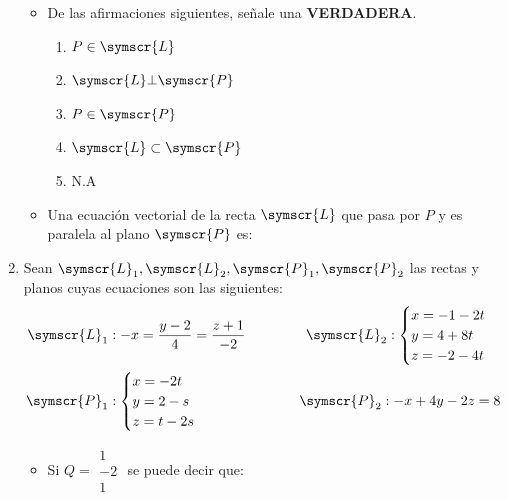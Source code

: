 \documentclass{article}
\def\fancyL{\symscr{L}}
\def\fancyP{\symscr{P}}
\begin{document}
\begin{enumerate}
\begin{itemize}
            \item De las afirmaciones siguientes, señale una \textbf{VERDADERA}.
                \begin{enumerate}
                    \item \(P \in \fancyL\)
                    \item \(\fancyL \bot \fancyP\)
                    \item \(P \in \fancyP\)
                    \item \(\fancyL \subset \fancyP\)
                    \item N.A
                \end{enumerate}
            \item Una ecuación vectorial de la recta \(\fancyL\) que pasa por \(P\) y es paralela al plano \(\fancyP\) es:
        \end{itemize}
\setcounter{enumi}{20}
\item Sean \(\fancyL_1, \fancyL_2, \fancyP_1, \fancyP_2\) las rectas y planos cuyas ecuaciones son las siguientes:
    \[
        \begin{aligned}
            \fancyL_1 &: -x = \frac{y - 2}{4} = \frac{z + 1}{-2}
            \hspace{1cm}
            &\fancyL_2: 
            \begin{cases}
                x = -1 -2t \\
                y = 4 +8t \\ 
                z = -2 -4t \\
            \end{cases} 
            \\
            \fancyP_1 &:
            \begin{cases}
                x = -2t \\
                y = 2 - s \\
                z = t - 2s
            \end{cases}
            \hspace{1cm}
            &\fancyP_2: -x + 4y - 2z = 8
            \\
        \end{aligned}
    \]
    \begin{itemize}
        \item Si \(Q = \begin{smallmatrix}1 \\ −2 \\ 1\end{smallmatrix}\) se puede decir que:

\end{itemize}
\end{enumerate}
\end{document}
